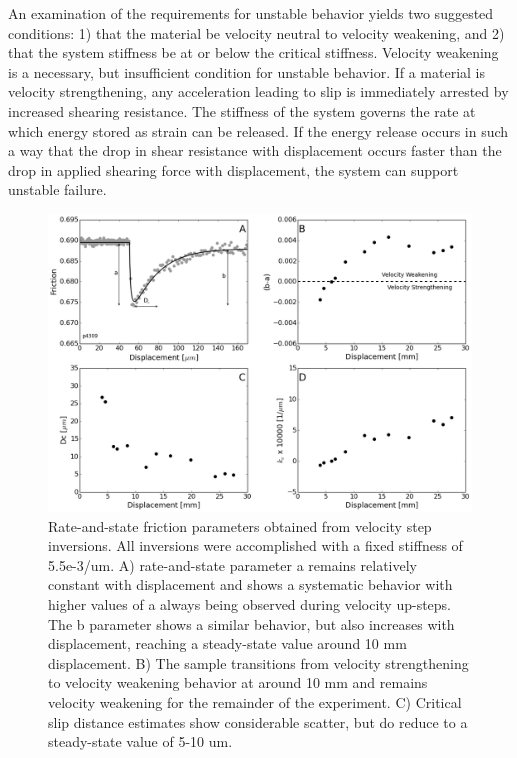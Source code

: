 \documentclass[11pt]{article}
\begin{document}
An examination of the requirements for unstable behavior yields two suggested
conditions: 1) that the material be velocity neutral to velocity weakening, and
2) that the system stiffness be at or below the critical stiffness. Velocity
weakening is a necessary, but insufficient condition for unstable behavior. If a
material is velocity strengthening, any acceleration leading to slip is
immediately arrested by increased shearing resistance. The stiffness of the
system governs the rate at which energy stored as strain can be released. If the
energy release occurs in such a way that the drop in shear resistance with
displacement occurs faster than the drop in applied shearing force with
displacement, the system can support unstable failure.

\begin{figure}
	\centering
		\includegraphics[scale=0.45]{../Figures/Fig_RSF_Parameters/RSF_Parameters.png}
   	\caption{Rate-and-state friction parameters obtained from velocity step inversions. All
inversions were accomplished with a fixed stiffness of 5.5e-3/um. A) rate-and-state
parameter a remains relatively constant with displacement and shows a systematic
behavior with higher values of a always being observed during velocity
up-steps. The b parameter shows a similar behavior, but also increases with
displacement, reaching a steady-state value around 10 mm displacement.
B) The sample transitions from velocity strengthening to velocity weakening
 behavior at around 10 mm and remains velocity weakening for the remainder of
 the experiment. C) Critical slip distance estimates show considerable scatter,
 but do reduce to a steady-state value of 5-10 um.  }
  	\label{Figure:RSF Props}
\end{figure}
\end{document}
